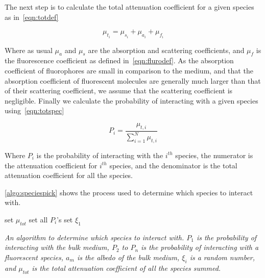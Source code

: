 The next step is to calculate the total attenuation coefficient for a given species as in~\cref{eqn:totdef}

\begin{equation}
\mu_{t_i}=\mu_{s_i}+\mu_{a_i}+\mu_{f_i}
\label{eqn:totdef}
\end{equation}

Where as usual $\mu_a$ and $\mu_s$ are the absorption and scattering coefficients, and $\mu_f$ is the fluorescence coefficient as defined in~\cref{eqn:flurodef}.
As the absorption coefficient of fluorophores are small in comparison to the medium, and that the absorption coefficient of fluorescent molecules are generally much larger than that of their scattering coefficient, we assume that the scattering coefficient is negligible.
Finally we calculate the probability of interacting with a given species using~\cref{eqn:totspec}

\begin{equation}
P_i=\frac{\mu_{t,i}}{\sum\limits_{i=1}^{N} \mu_{t,i}}
\label{eqn:totspec}
\end{equation}

Where $P_i$ is the probability of interacting with the $i^{th}$ species, the numerator is the attenuation coefficient for $i^{th}$ species, and the denominator is the total attenuation coefficient for all the species.

\cref{algo:speciespick} shows the process used to determine which species to interact with.

\newpage

\begin{center}
\begin{algorithm}[H]
\SetAlgoLined
  set $\mu_{tot}$\;
  set all $P_i$'s\;
  set $\xi_1$\;
\
\caption{\textit{An algorithm to determine which species to interact with. $P_1$ is the probability of interacting with the bulk medium, $P_2$ to $P_n$ is the probability of interacting with a fluorescent species, $a_m$ is the albedo of the bulk medium, $\xi_i$ is a random number, and $\mu_{tot}$ is the total attenuation coefficient of all the species summed.}}
\label{algo:speciespick}
\end{algorithm}
\end{center}

